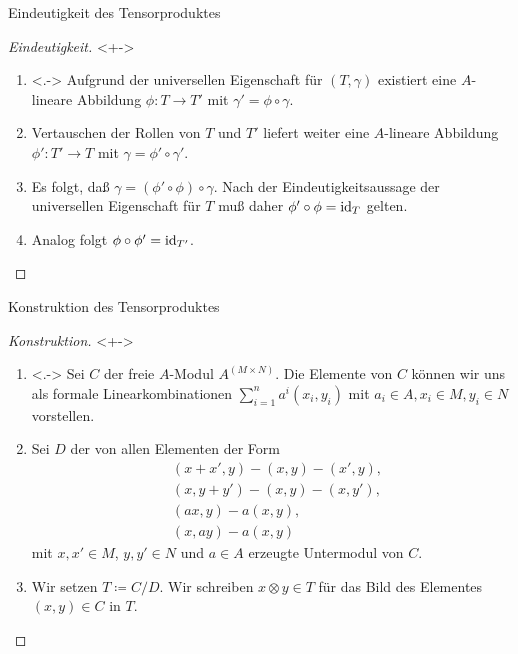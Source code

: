 \begin{frame}{Eindeutigkeit des Tensorproduktes}
	\begin{proof}[Eindeutigkeit]<+->
	\begin{enumerate}[<+->]
		\item<.->
			Aufgrund der universellen Eigenschaft für \((T, \gamma)\) existiert eine \(A\)-lineare Abbildung
			\(\phi\colon T \to T'\) mit \(\gamma' = \phi \circ \gamma\).
		\item
			Vertauschen der Rollen von \(T\) und \(T'\) liefert weiter eine \(A\)-lineare Abbildung
			\(\phi'\colon T' \to T\) mit \(\gamma = \phi' \circ \gamma'\).
		\item
			Es folgt, daß \(\gamma = (\phi' \circ \phi) \circ \gamma\). Nach der Eindeutigkeitsaussage der 
			universellen Eigenschaft für \(T\) muß daher \(\phi' \circ \phi = \operatorname{id}_T\) gelten.
		\item
			Analog folgt \(\phi \circ \phi' = \operatorname{id}_{T'}\).
			\renewcommand\qedsymbol{}
			\qedhere
		\end{enumerate}
	\end{proof}
\end{frame}

\begin{frame}{Konstruktion des Tensorproduktes}
	\begin{proof}[Konstruktion]<+->
		\begin{enumerate}[<+->]
		\item<.->
			Sei \(C\) der freie \(A\)-Modul \(A^{(M \times N)}\). Die Elemente von \(C\) können wir uns als
			formale Linearkombinationen \(\sum\limits_{i = 1}^n a^i (x_i, y_i)\) mit \(a_i \in A, x_i \in M,
			y_i \in N\) vorstellen.
		\item
			Sei \(D\) der von allen Elementen der Form
			\begin{align*}
				& (x + x', y) - (x, y) - (x', y),  \\
				& (x, y + y') - (x, y) - (x, y'),  \\
				& (ax, y) - a(x, y), \\
				& (x, ay) - a(x, y)
			\end{align*}
			mit \(x, x' \in M\), \(y, y' \in N\) und \(a \in A\) erzeugte Untermodul von \(C\).
		\item
			Wir setzen \(T \coloneqq C/D\). Wir schreiben \(x \otimes y \in T\) für das Bild des Elementes 
			\((x, y) \in C\) in \(T\).
			\renewcommand\qedsymbol{}
			\qedhere
		\end{enumerate}
	\end{proof}
\end{frame}

